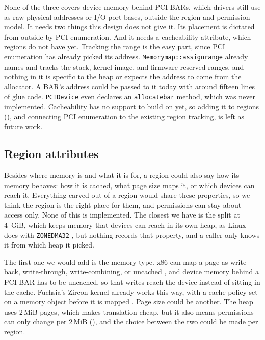 \documentclass[12pt]{report}
\newcommand{\fullref}[1]{\Cref{#1}}
\renewcommand{\_}{\origunderscore\allowbreak}
\begin{document}
None of the three covers device memory behind PCI BARs, which drivers still use as raw physical addresses or I/O port bases, outside the region and permission model. It needs two things this design does not give it. Its placement is dictated from outside by PCI enumeration. And it needs a cacheability attribute, which regions do not have yet. Tracking the range is the easy part, since PCI enumeration has already picked its address. \texttt{Memory\_map::assign\_range} already names and tracks the stack, kernel image, and firmware-reserved ranges, and nothing in it is specific to the heap or expects the address to come from the allocator. A BAR's address could be passed to it today with around fifteen lines of glue code. \texttt{PCI\_Device} even declares an \texttt{allocate\_bar} method, which was never implemented. Cacheability has no support to build on yet, so adding it to regions (\fullref{sec:region-attributes}), and connecting PCI enumeration to the existing region tracking, is left as future work.

\subsection{Region attributes}
\label{sec:region-attributes}

Besides where memory is and what it is for, a region could also say how its memory behaves: how it is cached, what page size maps it, or which devices can reach it. Everything carved out of a region would share these properties, so we think the region is the right place for them, and permissions can stay about access only. None of this is implemented. The closest we have is the split at 4~GiB, which keeps memory that devices can reach in its own heap, as Linux does with \texttt{ZONE\_DMA32} \cite{gorman2004vmm}, but nothing records that property, and a caller only knows it from which heap it picked.

The first one we would add is the memory type. x86 can map a page as write-back, write-through, write-combining, or uncached \cite{intel-sdm}, and device memory behind a PCI BAR has to be uncached, so that writes reach the device instead of sitting in the cache. Fuchsia's Zircon kernel already works this way, with a cache policy set on a memory object before it is mapped \cite{zircon-cache-policy}. Page size could be another. The heap uses 2\,MiB pages, which makes translation cheap, but it also means permissions can only change per 2\,MiB (\fullref{sec:mprotect-impl}), and the choice between the two could be made per region.
\end{document}
